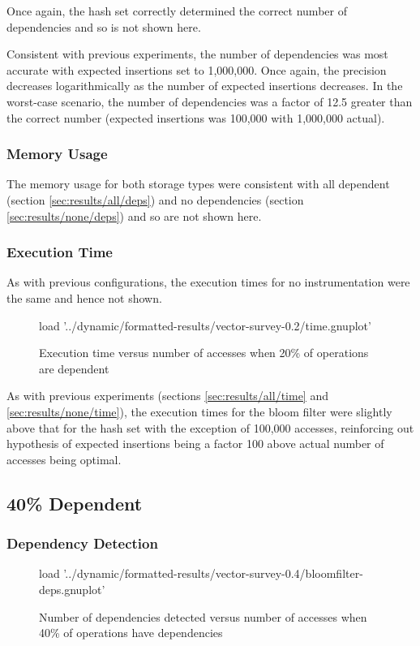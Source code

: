 		Once again, the hash set correctly determined the correct number of dependencies and so is not shown here.
		
		Consistent with previous experiments, the number of dependencies was most accurate with expected insertions set to 1,000,000. Once again, the precision decreases logarithmically as the number of expected insertions decreases. In the worst-case scenario, the number of dependencies was a factor of 12.5 greater than the correct number (expected insertions was 100,000 with 1,000,000 actual).
		
		\subsubsection{Memory Usage} \label{sec:results/20/mem}
		The memory usage for both storage types were consistent with all dependent (section \ref{sec:results/all/deps}) and no dependencies (section \ref{sec:results/none/deps}) and so are not shown here.
		
		\subsubsection{Execution Time} \label{sec:results/20/time}
		As with previous configurations, the execution times for no instrumentation were the same and hence not shown.
		
		\begin{figure}
			\centering
			\begin{gnuplot}[terminal=pdf]
				load '../dynamic/formatted-results/vector-survey-0.2/time.gnuplot'
			\end{gnuplot}
			\caption{Execution time versus number of accesses when 20\% of operations are dependent}
			\label{chart:20-time}
		\end{figure}
		
		As with previous experiments (sections \ref{sec:results/all/time} and \ref{sec:results/none/time}), the execution times for the bloom filter were slightly above that for the hash set with the exception of 100,000 accesses, reinforcing out hypothesis of expected insertions being a factor 100 above actual number of accesses being optimal.
	
	\subsection{40\% Dependent} \label{sec:results/40}
		\subsubsection{Dependency Detection} \label{sec:results/40/deps}
		\begin{figure}
			\centering
			\begin{gnuplot}[terminal=pdf]
			load  '../dynamic/formatted-results/vector-survey-0.4/bloomfilter-deps.gnuplot'
			\end{gnuplot}
			\caption{Number of dependencies detected versus number of accesses when 40\% of operations have dependencies}
			\label{chart:40-dep}
		\end{figure}
		
